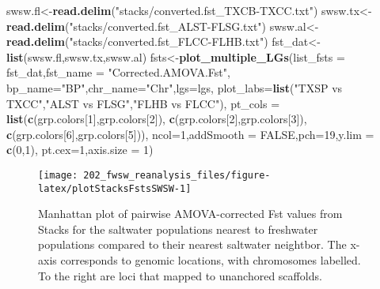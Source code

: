 \documentclass[11pt,]{article}
\newenvironment{Shaded}{\begin{snugshade}}{\end{snugshade}}
\newcommand{\KeywordTok}[1]{\textcolor[rgb]{0.13,0.29,0.53}{\textbf{#1}}}
\newcommand{\DataTypeTok}[1]{\textcolor[rgb]{0.13,0.29,0.53}{#1}}
\newcommand{\DecValTok}[1]{\textcolor[rgb]{0.00,0.00,0.81}{#1}}
\newcommand{\StringTok}[1]{\textcolor[rgb]{0.31,0.60,0.02}{#1}}
\newcommand{\OtherTok}[1]{\textcolor[rgb]{0.56,0.35,0.01}{#1}}
\newcommand{\NormalTok}[1]{#1}
\begin{document}
\begin{Shaded}
\begin{Highlighting}[]
\NormalTok{swsw.fl<-}\KeywordTok{read.delim}\NormalTok{(}\StringTok{"stacks/converted.fst_TXCB-TXCC.txt"}\NormalTok{)}
\NormalTok{swsw.tx<-}\KeywordTok{read.delim}\NormalTok{(}\StringTok{"stacks/converted.fst_ALST-FLSG.txt"}\NormalTok{)}
\NormalTok{swsw.al<-}\KeywordTok{read.delim}\NormalTok{(}\StringTok{"stacks/converted.fst_FLCC-FLHB.txt"}\NormalTok{)}
\NormalTok{fst_dat<-}\KeywordTok{list}\NormalTok{(swsw.fl,swsw.tx,swsw.al)}
\NormalTok{fsts<-}\KeywordTok{plot_multiple_LGs}\NormalTok{(}\DataTypeTok{list_fsts =}\NormalTok{ fst_dat,}\DataTypeTok{fst_name =} \StringTok{"Corrected.AMOVA.Fst"}\NormalTok{,}
                        \DataTypeTok{bp_name=}\StringTok{"BP"}\NormalTok{,}\DataTypeTok{chr_name=}\StringTok{"Chr"}\NormalTok{,}\DataTypeTok{lgs=}\NormalTok{lgs,}
                        \DataTypeTok{plot_labs=}\KeywordTok{list}\NormalTok{(}\StringTok{"TXSP vs TXCC"}\NormalTok{,}\StringTok{"ALST vs FLSG"}\NormalTok{,}\StringTok{"FLHB vs FLCC"}\NormalTok{),}
                        \DataTypeTok{pt_cols =} \KeywordTok{list}\NormalTok{(}\KeywordTok{c}\NormalTok{(grp.colors[}\DecValTok{1}\NormalTok{],grp.colors[}\DecValTok{2}\NormalTok{]),}
                                       \KeywordTok{c}\NormalTok{(grp.colors[}\DecValTok{2}\NormalTok{],grp.colors[}\DecValTok{3}\NormalTok{]),}
                                       \KeywordTok{c}\NormalTok{(grp.colors[}\DecValTok{6}\NormalTok{],grp.colors[}\DecValTok{5}\NormalTok{])),}
                        \DataTypeTok{ncol=}\DecValTok{1}\NormalTok{,}\DataTypeTok{addSmooth =} \OtherTok{FALSE}\NormalTok{,}\DataTypeTok{pch=}\DecValTok{19}\NormalTok{,}\DataTypeTok{y.lim =} \KeywordTok{c}\NormalTok{(}\DecValTok{0}\NormalTok{,}\DecValTok{1}\NormalTok{),}
                        \DataTypeTok{pt.cex=}\DecValTok{1}\NormalTok{,}\DataTypeTok{axis.size =} \DecValTok{1}\NormalTok{)}
\end{Highlighting}
\end{Shaded}

\begin{figure}[H]
\texttt{[image: 202\_fwsw\_reanalysis\_files/figure-latex/plotStacksFstsSWSW-1]} \caption{Manhattan plot of pairwise AMOVA-corrected Fst values from Stacks for the saltwater populations nearest to freshwater populations compared to their nearest saltwater neightbor. The x-axis corresponds to genomic locations, with chromosomes labelled. To the right are loci that mapped to unanchored scaffolds.}\label{fig:plotStacksFstsSWSW}
\end{figure}
\end{document}

